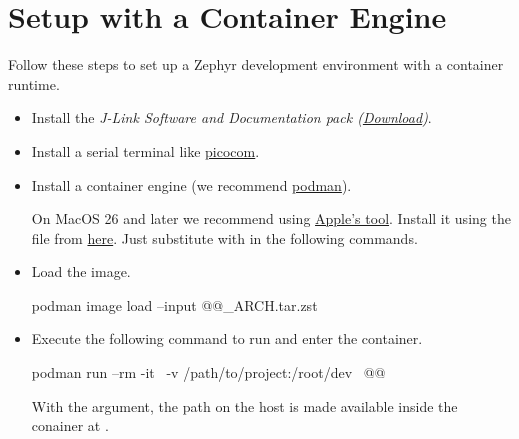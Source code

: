 \section{Setup with a Container Engine}
\label{setupwithcontainerengine}

Follow these steps to set up a Zephyr development environment with a container runtime.

\begin{itemize}
  \item Install the \emph{J-Link Software and Documentation pack (\href{https://www.segger.com/downloads/jlink}{Download})}.
  \item Install a serial terminal like \href{https://formulae.brew.sh/formula/picocom}{picocom}.
  \item Install a container engine (we recommend \href{https://podman.io/docs/installation}{podman}).
    \begin{infobox}
      On MacOS 26 and later we recommend using \href{https://opensource.apple.com/projects/container/}{Apple's  tool}.
      Install it using the  file from \href{https://github.com/apple/container/releases}{here}.
      Just substitute  with  in the following commands.
    \end{infobox}
  \item Load the image.
        \begin{monobox}
podman image load --input @\imagename{}@_ARCH.tar.zst
\end{monobox}
  \item Execute the following command to run and enter the container.
        \begin{monobox}
podman run --rm -it \
  -v /path/to/project:/root/dev \
  @\imagename{}@
\end{monobox}
    With the  argument, the  path on the host is made available inside the conainer at .
\end{itemize}
